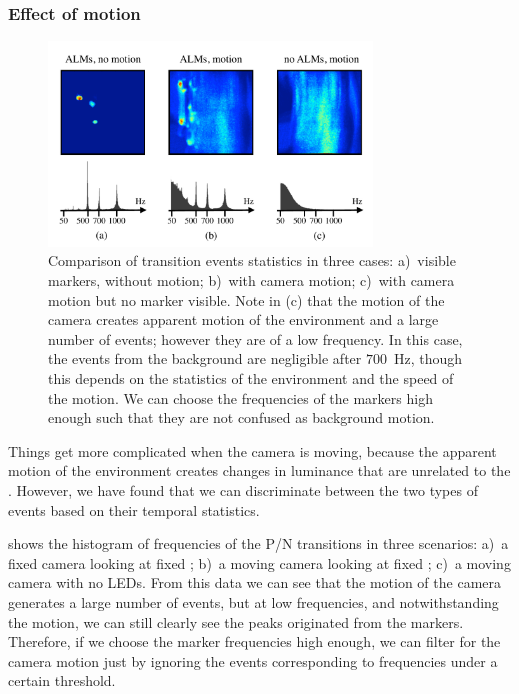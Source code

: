 \subsubsection{Effect of motion\label{sub:Alternate-events-and-motion}}

\begin{figure}[b]
\centering{}\includegraphics[width=8.6cm]{figures/slides/motion}\caption{\label{fig:switch-hist}Comparison of transition events statistics
in three cases: a)~visible markers, without motion; b)~with camera
motion; c)~with camera motion but no marker visible. Note in (c)
that the motion of the camera creates apparent motion of the environment
and a large number of events; however they are of a low frequency.
In this case, the events from the background are negligible after
$700$~Hz, though this depends on the statistics of the environment
and the speed of the motion. We can choose the frequencies of the
markers high enough such that they are not confused as background
motion.}
\end{figure}


Things get more complicated when the camera is moving, because the
apparent motion of the environment creates changes in luminance that
are unrelated to the \ALMs. However, we have found that we can discriminate
between the two types of events based on their temporal statistics.

 shows the histogram of frequencies of
the P/N transitions in three scenarios: a)~a fixed camera looking
at fixed \ALMs; b)~a moving camera looking at fixed \ALMs; c)~a
moving camera with no LEDs. From this data we can see that the motion
of the camera generates a large number of events, but at low frequencies,
and notwithstanding the motion, we can still clearly see the peaks
originated from the markers. Therefore, if we choose the marker frequencies
high enough, we can filter for the camera motion just by ignoring
the events corresponding to frequencies under a certain threshold. 
